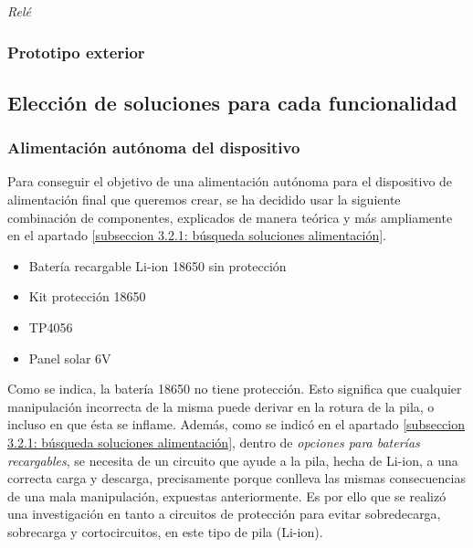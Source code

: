 \documentclass[12pt]{article}
\begin{document}
	\noindent \textit{Relé} \\
	
	\pagebreak
	
	\subsubsection{Prototipo exterior}

	\pagebreak
	
	\subsection[Elección soluciones]{Elección de soluciones para cada funcionalidad}
	\label{Subsección 3.3: elección de soluciones para cada funcionalidad}
	
	\subsubsection{Alimentación autónoma del dispositivo}
	
	\noindent Para conseguir el objetivo de una alimentación autónoma para el dispositivo de alimentación final que queremos crear, se ha decidido usar la siguiente combinación de componentes, explicados de manera teórica y más ampliamente en el apartado \ref{subseccion 3.2.1: búsqueda soluciones alimentación}. \\
	
	\begin{itemize}
		\item Batería recargable Li-ion 18650 sin protección
		\item Kit protección 18650
		\item TP4056
		\item Panel solar 6V
	\end{itemize}
	
	\noindent Como se indica, la batería 18650 no tiene protección. Esto significa que cualquier manipulación incorrecta de la misma puede derivar en la rotura de la pila, o incluso en que ésta se inflame.  Además, como se indicó en el apartado \ref{subseccion 3.2.1: búsqueda soluciones alimentación}, dentro de \textit{opciones para baterías recargables}, se necesita de un circuito que ayude a la pila, hecha de Li-ion, a una correcta carga y descarga, precisamente porque conlleva las mismas consecuencias de una mala manipulación, expuestas anteriormente. Es por ello que se realizó una investigación en tanto a circuitos de protección para evitar sobredecarga, sobrecarga y cortocircuitos, en este tipo de pila (Li-ion). \\
	
\end{document}
